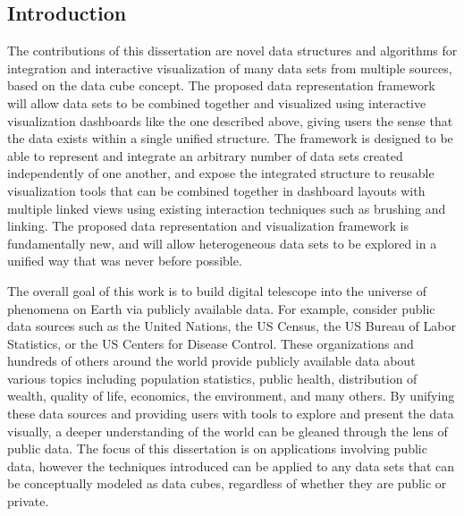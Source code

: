 \documentclass[12pt]{article}
\begin{document}
\begin{doublespace}
\section{Introduction}
The contributions of this dissertation are novel data structures and algorithms for integration and interactive visualization of many data sets from multiple sources, based on the data cube concept. The proposed data representation framework will allow data sets to be combined together and visualized using interactive visualization dashboards like the one described above, giving users the sense that the data exists within a single unified structure. The framework is designed to be able to represent and integrate an arbitrary number of data sets created independently of one another, and expose the integrated structure to reusable visualization tools that can be combined together in dashboard layouts with multiple linked views using existing interaction techniques such as brushing and linking. The proposed data representation and visualization framework is fundamentally new, and will allow heterogeneous data sets to be explored in a unified way that was never before possible. 

The overall goal of this work is to build digital telescope into the universe of phenomena on Earth via publicly available data. For example, consider public data sources such as the United Nations, the US Census, the US Bureau of Labor Statistics, or the US Centers for Disease Control. These organizations and hundreds of others around the world provide publicly available data about various topics including population statistics, public health, distribution of wealth, quality of life, economics, the environment, and many others. By unifying these data sources and providing users with tools to explore and present the data visually, a deeper understanding of the world can be gleaned through the lens of public data. The focus of this dissertation is on applications involving public data, however the techniques introduced can be applied to any data sets that can be conceptually modeled as data cubes, regardless of whether they are public or private. 


\end{doublespace}
\end{document}
